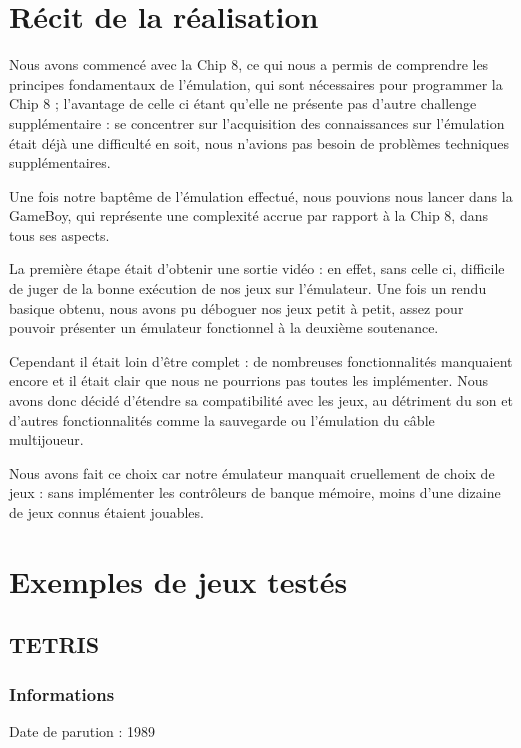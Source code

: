 \documentclass[12pt, a4paper]{article}
\begin{document}
\pagebreak
\section{Récit de la réalisation}

Nous avons commencé avec la Chip 8, ce qui nous a permis de comprendre les principes fondamentaux de l'émulation, qui sont nécessaires pour programmer la Chip 8 ; l'avantage de celle ci étant qu'elle ne présente pas d'autre challenge supplémentaire : se concentrer sur l'acquisition des connaissances sur l'émulation était déjà une difficulté en soit, nous n'avions pas besoin de problèmes techniques supplémentaires.

\bigskip
Une fois notre baptême de l'émulation effectué, nous pouvions nous lancer dans la GameBoy, qui représente une complexité accrue par rapport à la Chip 8, dans tous ses aspects. 

\bigskip
La première étape était d'obtenir une sortie vidéo : en effet, sans celle ci, difficile de juger de la bonne exécution de nos jeux sur l'émulateur. Une fois un rendu basique obtenu, nous avons pu déboguer nos jeux petit à petit, assez pour pouvoir présenter un émulateur fonctionnel à la deuxième soutenance. 

\bigskip
Cependant il était loin d'être complet : de nombreuses fonctionnalités manquaient encore et il était clair que nous ne pourrions pas toutes les implémenter. Nous avons donc décidé d'étendre sa compatibilité avec les jeux, au détriment du son et d'autres fonctionnalités comme la sauvegarde ou l'émulation du câble multijoueur.

\bigskip
Nous avons fait ce choix car notre émulateur manquait cruellement de choix de jeux : sans implémenter les contrôleurs de banque mémoire, moins d'une dizaine de jeux connus étaient jouables.


\pagebreak

\section{Exemples de jeux testés}

\subsection{TETRIS}

\subsubsection{Informations}
Date de parution : 1989
\end{document}
